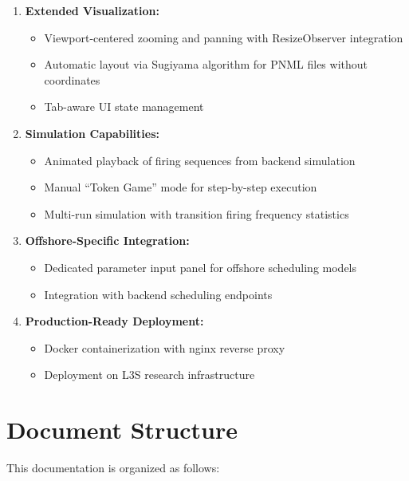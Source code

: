 \begin{enumerate}
    \item \textbf{Extended Visualization:}
    \begin{itemize}
        \item Viewport-centered zooming and panning with ResizeObserver integration
        \item Automatic layout via Sugiyama algorithm for PNML files without coordinates
        \item Tab-aware UI state management
    \end{itemize}
    
    \item \textbf{Simulation Capabilities:}
    \begin{itemize}
        \item Animated playback of firing sequences from backend simulation
        \item Manual ``Token Game'' mode for step-by-step execution
        \item Multi-run simulation with transition firing frequency statistics
    \end{itemize}
    
    \item \textbf{Offshore-Specific Integration:}
    \begin{itemize}
        \item Dedicated parameter input panel for offshore scheduling models
        \item Integration with backend scheduling endpoints
    \end{itemize}
    
    \item \textbf{Production-Ready Deployment:}
    \begin{itemize}
        \item Docker containerization with nginx reverse proxy
        \item Deployment on L3S research infrastructure
    \end{itemize}
\end{enumerate}

\section{Document Structure}
\label{sec:document-structure}

This documentation is organized as follows:

